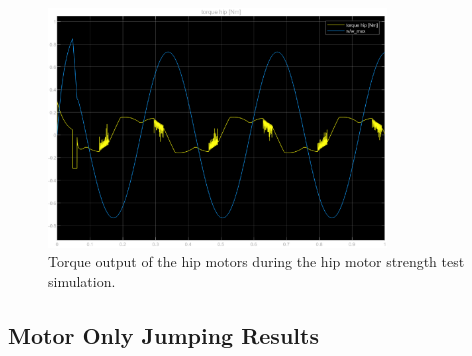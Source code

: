 \begin{figure}[H]
    \centering
    \includegraphics[width=0.8\textwidth]{Images/hip_motor_torque.eps}
    \caption{Torque output of the hip motors during the hip motor strength test simulation.}
    \label{fig:hip_motor_torque_test}
\end{figure}

\subsection{Motor Only Jumping Results}
\label{sec:results_motor_only_jumps}

